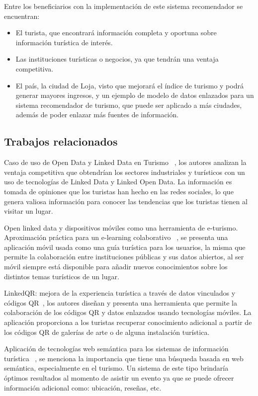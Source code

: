 \documentclass[lnbip,sechang,a4paper]{svmultln}
\begin{document}
Entre los beneficiarios con la implementación de este sistema recomendador se encuentran:

\begin{itemize}
    \item El turista, que encontrará información completa y oportuna sobre información turística de interés.
    \item Las instituciones turísticas o negocios, ya que tendrán una ventaja competitiva.
    \item El país, la ciudad de Loja, visto que mejorará el índice de turismo y podrá generar mayores ingresos, y un ejemplo de modelo de datos enlazados para un sistema recomendador de turismo, que puede ser aplicado a más ciudades, además de poder enlazar más fuentes de información.

\end{itemize}

\subsection{Trabajos relacionados}

Caso de uso de Open Data y Linked Data en Turismo ~\cite{uno}, los autores analizan la ventaja competitiva que obtendrían  los sectores industriales y turísticos con un uso de tecnologías de Linked Data y Linked Open Data. La información es tomada de opiniones que los turistas han hecho en las redes sociales, lo que genera valiosa información para conocer las tendencias que los turistas tienen al visitar un lugar.

Open linked data y dispositivos móviles como una herramienta de e-turismo. Aproximación práctica para un e-learning colaborativo ~\cite{dos}, se presenta una aplicación móvil usada como una guía turística para los usuarios, la misma que permite la colaboración entre instituciones públicas y sus datos abiertos, al ser móvil siempre está disponible para añadir nuevos conocimientos sobre los distintos temas turísticos de un lugar.


LinkedQR: mejora de la experiencia turística a través de datos vinculados y códigos QR~\cite{cinco}, los autores diseñan y presenta una herramienta que permite la colaboración de los códigos QR y datos enlazados usando tecnologías móviles. La aplicación proporciona a los turistas recuperar conocimiento adicional a partir de los códigos QR  de galerías de arte o de alguna instalación turística.

Aplicación de tecnologías web semántica para los sistemas de información turística ~\cite{seis}, se menciona la importancia que tiene una búsqueda basada en web semántica, especialmente en el turismo. Un sistema de este tipo  brindaría óptimos resultados al momento de asistir un evento ya que se puede ofrecer información adicional como: ubicación, reseñas, etc. 
\end{document}
